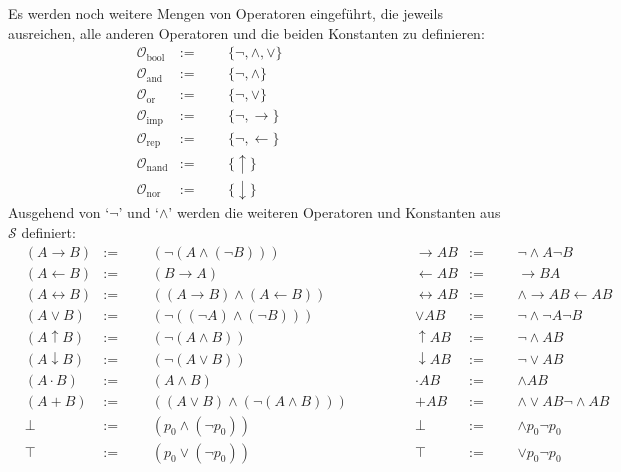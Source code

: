 \documentclass[english,ngerman,parskip=half,headsepline,footsepline,
	fleqn,notitlepage]{scrreprt}
\newcommand*{\defeq}{:=}%
\newcommand*{\ladd}{+}
\newcommand*{\lmult}{\cdot}
\newcommand*{\ltrue}{\top}%
\newcommand*{\lfalse}{\bot}%
\newcommand*{\lrep}{\leftarrow}%
\newcommand*{\limp}{\rightarrow}%
\newcommand*{\lequiv}{\leftrightarrow}%
\newcommand*{\lnand}{\uparrow}%
\newcommand*{\lnor}{\downarrow}%
\newcommand*{\asS}{\mathcal{S}}%
\newcommand*{\asO}{\mathcal{O}}%
\newcommand*{\asObool}{\asO_\mathrm{bool}}
\newcommand*{\asOand}{\asO_\mathrm{and}}
\newcommand*{\asOor}{\asO_\mathrm{or}}
\newcommand*{\asOimp}{\asO_\mathrm{imp}}
\newcommand*{\asOrep}{\asO_\mathrm{rep}}
\newcommand*{\asOnand}{\asO_\mathrm{nand}}
\newcommand*{\asOnor}{\asO_\mathrm{nor}}
\newcommand*{\formulatoleft}{&&&&&&&&&&}%
\newcommand*{\formulaspace}{&&&&}%
\newcommand*{\charqt}[1]{\enquote*{#1}}%
\newcommand*{\symqt}[1]{\charqt{#1}}%
\begin{document}
	Es werden noch weitere Mengen von Operatoren eingeführt,
	die jeweils ausreichen,
	alle anderen Operatoren und die beiden Konstanten zu definieren:
	\begin{align}
		& \asObool & \defeq & & & \{ \lnot, \land, \lor \} \label{def:Obool} \\
		& \asOand  & \defeq & & & \{ \lnot, \land       \} \label{def:Oand}  \\
		& \asOor   & \defeq & & & \{ \lnot, \lor        \} \label{def:Oor}   \\
		& \asOimp  & \defeq & & & \{ \lnot, \limp       \} \label{def:Oimp}  \\
		& \asOrep  & \defeq & & & \{ \lnot, \lrep       \} \label{def:Orep}  \\
		& \asOnand & \defeq & & & \{ \lnand             \} \label{def:Onand} \\
		& \asOnor  & \defeq & & & \{ \lnor              \} \label{def:Onor}
		\formulatoleft
	\end{align}
	Ausgehend von \symqt{$\lnot$} und \symqt{$\land$}
	werden die weiteren Operatoren und Konstanten aus $\asS$ definiert:
	\begin{align}
		&                 (A \limp B) & \defeq & & & (\lnot (A \land (\lnot B)))
		& \formulaspace &   \limp A B & \defeq & & & \lnot \land A \lnot B
		\label{def:imp}   \\
		&                 (A \lrep B) & \defeq & & & (B \limp A)
		& \formulaspace &   \lrep A B & \defeq & & & \limp B A
		\label{def:rep}   \\
		&               (A \lequiv B) & \defeq & & & ((A\limp B)\land(A\lrep B))
		& \formulaspace & \lequiv A B & \defeq & & & \land \limp A B \lrep A B
		\label{def:equiv} \\
		&             (A \lor B) & \defeq & & & (\lnot((\lnot A)\land(\lnot B)))
		& \formulaspace &    \lor A B & \defeq & & & \lnot \land \lnot A \lnot B
		\label{def:or}    \\
		&                (A \lnand B) & \defeq & & & (\lnot (A \land B ))
		& \formulaspace &  \lnand A B & \defeq & & & \lnot \land A B
		\label{def:nand}  \\
		&                 (A \lnor B) & \defeq & & & (\lnot (A \lor B))
		& \formulaspace &   \lnor A B & \defeq & & & \lnot \lor A B
		\label{def:nor}   \\
		&                (A \lmult B) & \defeq & & & (A \land B)
		& \formulaspace &  \lmult A B & \defeq & & & \land A B
		\label{def:mult}  \\
		&           (A \ladd B) & \defeq & & & ((A\lor B)\land(\lnot(A\land B)))
		& \formulaspace &   \ladd A B & \defeq & & & \land\lor A B\lnot\land A B
		\label{def:add}   \\
		&                     \lfalse & \defeq & & & (p_0 \land (\lnot p_0))
		& \formulaspace &     \lfalse & \defeq & & & \land p_0 \lnot p_0
		\label{def:false} \\
		&                      \ltrue & \defeq & & & (p_0 \lor (\lnot p_0))
		& \formulaspace &      \ltrue & \defeq & & & \lor p_0 \lnot p_0
		\label{def:true}  \formulatoleft
	\end{align}
\end{document}
